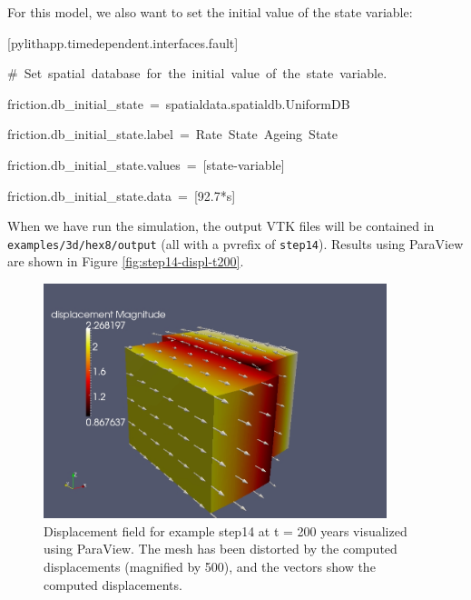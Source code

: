 For this model, we also want to set the initial value of the state
variable:
\begin{lyxcode}
{[}pylithapp.timedependent.interfaces.fault{]}

\#~Set~spatial~database~for~the~initial~value~of~the~state~variable.

friction.db\_initial\_state~=~spatialdata.spatialdb.UniformDB

friction.db\_initial\_state.label~=~Rate~State~Ageing~State

friction.db\_initial\_state.values~=~{[}state-variable{]}

friction.db\_initial\_state.data~=~{[}92.7{*}s{]}
\end{lyxcode}
When we have run the simulation, the output VTK files will be contained
in \texttt{examples/3d/hex8/output} (all with a pvrefix of \texttt{step14}).
Results using ParaView are shown in Figure \vref{fig:step14-displ-t200}.

\begin{figure}
\begin{centering}
\includegraphics[width=10cm]{tutorials/3dhex8/figs/step14-displ-t200}
\par\end{centering}

\caption{Displacement field for example step14 at t = 200 years visualized
using ParaView. The mesh has been distorted by the computed displacements
(magnified by 500), and the vectors show the computed displacements.\label{fig:step14-displ-t200}}
\end{figure}

